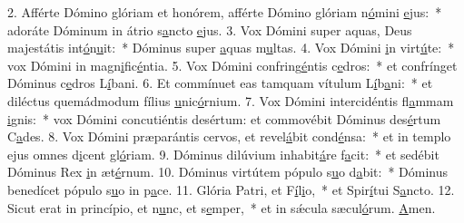 2. Afférte Dómino glóriam et honórem, afférte Dómino glóriam n\uline{ó}mini \uline{e}jus:~* adoráte Dóminum in átrio s\uline{a}ncto \uline{e}jus.
3. Vox Dómini super aquas, Deus majestátis int\uline{ó}n\uline{u}it:~* Dóminus super \uline{a}quas m\uline{u}ltas.
4. Vox Dómini \uline{i}n virt\uline{ú}te:~* vox Dómini in magn\uline{i}fic\uline{é}ntia.
5. Vox Dómini confring\uline{é}ntis c\uline{e}dros:~* et confrínget Dóminus c\uline{e}dros L\uline{í}bani.
6. Et commínuet eas tamquam vítulum L\uline{í}b\uline{a}ni:~* et diléctus quemádmodum fílius \uline{u}nic\uline{ó}rnium.
7. Vox Dómini intercidéntis fl\uline{a}mmam \uline{i}gnis:~* vox Dómini concutiéntis desértum: et commovébit Dóminus des\uline{é}rtum C\uline{a}des.
8. Vox Dómini præparántis cervos, et revel\uline{á}bit cond\uline{é}nsa:~* et in templo ejus omnes d\uline{i}cent gl\uline{ó}riam.
9. Dóminus dilúvium inhabit\uline{á}re f\uline{a}cit:~* et sedébit Dóminus Rex \uline{i}n æt\uline{é}rnum.
10. Dóminus virtútem pópulo s\uline{u}o d\uline{a}bit:~* Dóminus benedícet pópulo s\uline{u}o in p\uline{a}ce.
11. Glória Patri, et F\uline{í}l\uline{i}o,~* et Spir\uline{í}tui S\uline{a}ncto.
12. Sicut erat in princípio, et n\uline{u}nc, et s\uline{e}mper,~* et in sǽcula sæcul\uline{ó}rum. \uline{A}men.
